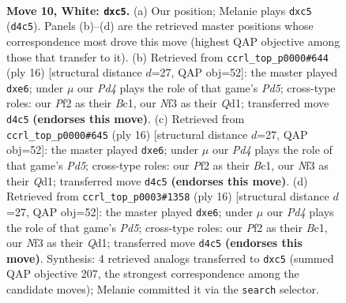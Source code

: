 \documentclass[11pt]{article}
\begin{document}
\clearpage

\begin{figure}[p]\centering
\begin{subfigure}{0.46\textwidth}\centering
\resizebox{\linewidth}{!}{%
\newchessgame
\chessboard[
  setfen={rnbq1rk1/1p2p1b1/3p1np1/p1p2p1p/2PP4/2N2NP1/PP2PPBP/R1BQ1RK1 w - - 0 10},
  showmover=false,
  pgfstyle=straightmove, color=movearrow, markmove={d4-c5}
]}
\caption{}
\end{subfigure}\hfill
\begin{subfigure}{0.46\textwidth}\centering
\resizebox{\linewidth}{!}{%
\newchessgame
\chessboard[
  setfen={rnbq1rk1/pp4bp/2pp1np1/3Ppp2/2P5/2N2NP1/PP2PPBP/R1BQ1RK1 w - e6 0 9},
  showmover=false,
  pgfstyle=straightmove, color=movearrow, markmove={d5-e6}
]}
\caption{}
\end{subfigure}
\\[4pt]
\begin{subfigure}{0.46\textwidth}\centering
\resizebox{\linewidth}{!}{%
\newchessgame
\chessboard[
  setfen={rnbq1rk1/pp4bp/2pp1np1/3Ppp2/2P5/2N2NP1/PP2PPBP/R1BQ1RK1 w - e6 0 9},
  showmover=false,
  pgfstyle=straightmove, color=movearrow, markmove={d5-e6}
]}
\caption{}
\end{subfigure}\hfill
\begin{subfigure}{0.46\textwidth}\centering
\resizebox{\linewidth}{!}{%
\newchessgame
\chessboard[
  setfen={rnbq1rk1/pp4bp/2pp1np1/3Ppp2/2P5/2N2NP1/PP2PPBP/R1BQ1RK1 w - e6 0 9},
  showmover=false,
  pgfstyle=straightmove, color=movearrow, markmove={d5-e6}
]}
\caption{}
\end{subfigure}
\caption{\textbf{Move 10, White: \texttt{dxc5}.} (a) Our position; Melanie plays \texttt{dxc5} (\texttt{d4c5}). Panels (b)--(d) are the retrieved master positions whose correspondence most drove this move (highest QAP objective among those that transfer to it). (b) Retrieved from \texttt{ccrl\_top\_p0000\#644} (ply 16) [structural distance $d$=27, QAP obj=52]: the master played \texttt{dxe6}; under $\mu$ our \emph{Pd4} plays the role of that game's \emph{Pd5}; cross-type roles: our \emph{P}f2 as their \emph{B}c1, our \emph{N}f3 as their \emph{Q}d1; transferred move \texttt{d4c5} \textbf{(endorses this move)}. (c) Retrieved from \texttt{ccrl\_top\_p0000\#645} (ply 16) [structural distance $d$=27, QAP obj=52]: the master played \texttt{dxe6}; under $\mu$ our \emph{Pd4} plays the role of that game's \emph{Pd5}; cross-type roles: our \emph{P}f2 as their \emph{B}c1, our \emph{N}f3 as their \emph{Q}d1; transferred move \texttt{d4c5} \textbf{(endorses this move)}. (d) Retrieved from \texttt{ccrl\_top\_p0003\#1358} (ply 16) [structural distance $d$=27, QAP obj=52]: the master played \texttt{dxe6}; under $\mu$ our \emph{Pd4} plays the role of that game's \emph{Pd5}; cross-type roles: our \emph{P}f2 as their \emph{B}c1, our \emph{N}f3 as their \emph{Q}d1; transferred move \texttt{d4c5} \textbf{(endorses this move)}. Synthesis: 4 retrieved analogs transferred to \texttt{dxc5} (summed QAP objective 207, the strongest correspondence among the candidate moves); Melanie committed it via the \texttt{search} selector.}
\label{fig:thought-m18}
\end{figure}
\end{document}
